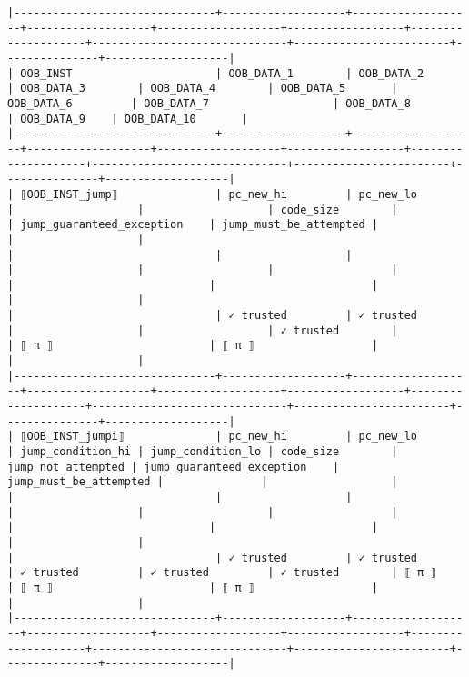 \documentclass[varwidth=\maxdimen,margin=0.5cm,multi={verbatim}]{standalone}
\begin{document}
\begin{verbatim}
|-------------------------------+-------------------+-------------------+-------------------+-------------------+------------------+--------------------+------------------------------+------------------------+---------------+-------------------|
| OOB_INST                      | OOB_DATA_1        | OOB_DATA_2        | OOB_DATA_3        | OOB_DATA_4        | OOB_DATA_5       | OOB_DATA_6         | OOB_DATA_7                   | OOB_DATA_8             | OOB_DATA_9    | OOB_DATA_10       |
|-------------------------------+-------------------+-------------------+-------------------+-------------------+------------------+--------------------+------------------------------+------------------------+---------------+-------------------|
| ⟦OOB_INST_jump⟧               | pc_new_hi         | pc_new_lo         |                   |                   | code_size        |                    | jump_guaranteed_exception    | jump_must_be_attempted |               |                   |
|                               |                   |                   |                   |                   |                  |                    |                              |                        |               |                   |
|                               | ✓ trusted         | ✓ trusted         |                   |                   | ✓ trusted        |                    | ⟦ π ⟧                        | ⟦ π ⟧                  |               |                   |
|-------------------------------+-------------------+-------------------+-------------------+-------------------+------------------+--------------------+------------------------------+------------------------+---------------+-------------------|
| ⟦OOB_INST_jumpi⟧              | pc_new_hi         | pc_new_lo         | jump_condition_hi | jump_condition_lo | code_size        | jump_not_attempted | jump_guaranteed_exception    | jump_must_be_attempted |               |                   |
|                               |                   |                   |                   |                   |                  |                    |                              |                        |               |                   |
|                               | ✓ trusted         | ✓ trusted         | ✓ trusted         | ✓ trusted         | ✓ trusted        | ⟦ π ⟧              | ⟦ π ⟧                        | ⟦ π ⟧                  |               |                   |
|-------------------------------+-------------------+-------------------+-------------------+-------------------+------------------+--------------------+------------------------------+------------------------+---------------+-------------------|

\end{verbatim}
\end{document}
